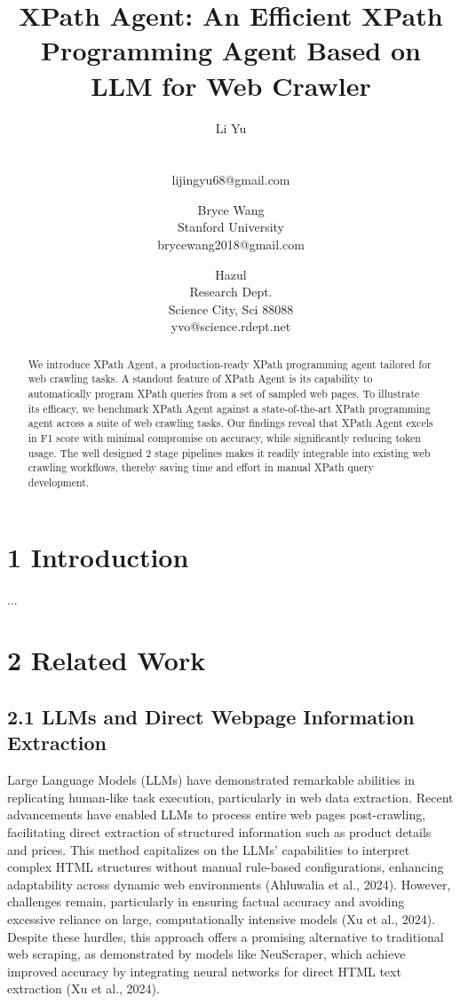 \documentclass[a4paper]{article}
\title{XPath Agent: An Efficient XPath Programming Agent Based on LLM for Web Crawler}
\author{
Li Yu \\ \\ \\ lijingyu68@gmail.com
\and
Bryce Wang \\ Stanford University  \\ brycewang2018@gmail.com
\and
Hazul \\ Research Dept.\\
                Science City, Sci 88088 \\ yvo@science.rdept.net
}
\begin{document}
\maketitle

\begin{abstract}
We introduce XPath Agent, a production-ready XPath programming agent tailored for web crawling tasks. A standout feature of XPath Agent is its capability to automatically program XPath queries from a set of sampled web pages. To illustrate its efficacy, we benchmark XPath Agent against a state-of-the-art XPath programming agent across a suite of web crawling tasks. Our findings reveal that XPath Agent excels in F1 score with minimal compromise on accuracy, while significantly reducing token usage. The well designed 2 stage pipelines makes it readily integrable into existing web crawling workflows, thereby saving time and effort in manual XPath query development.
\end{abstract}


\section{1 Introduction}

...

\section{2 Related Work}
\subsection{2.1 LLMs and Direct Webpage Information Extraction}
Large Language Models (LLMs) have demonstrated remarkable abilities in replicating human-like task execution, particularly in web data extraction. Recent advancements have enabled LLMs to process entire web pages post-crawling, facilitating direct extraction of structured information such as product details and prices. This method capitalizes on the LLMs' capabilities to interpret complex HTML structures without manual rule-based configurations, enhancing adaptability across dynamic web environments (Ahluwalia et al., 2024). However, challenges remain, particularly in ensuring factual accuracy and avoiding excessive reliance on large, computationally intensive models (Xu et al., 2024). Despite these hurdles, this approach offers a promising alternative to traditional web scraping, as demonstrated by models like NeuScraper, which achieve improved accuracy by integrating neural networks for direct HTML text extraction (Xu et al., 2024).
\end{document}
